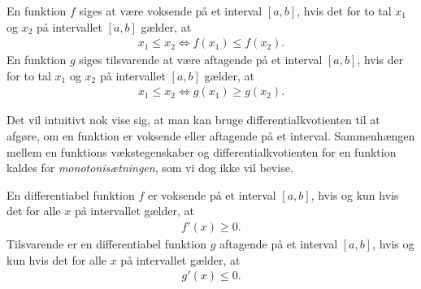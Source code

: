 \begin{defn}
	En funktion $f$ siges at være voksende på et interval $[a,b]$, hvis det for to tal $x_1$ og $x_2$ på 
	intervallet $[a,b]$ gælder, at 
	\begin{align*}
		x_1 \leq x_2 \Leftrightarrow f(x_1) \leq f(x_2).
	\end{align*}
	En funktion $g$ siges tilsvarende at være aftagende på et interval $[a,b]$, hvis der for to tal $x_1$ og 
	$x_2$ på intervallet $[a,b]$ gælder, at 
	\begin{align*}
		x_1 \leq x_2 \Leftrightarrow g(x_1) \geq g(x_2).
	\end{align*}
\end{defn}
Det vil intuitivt nok vise sig, at man kan bruge differentialkvotienten til at afgøre, om en funktion er 
voksende eller aftagende på et interval. Sammenhængen mellem en funktions vækstegenskaber og 
differentialkvotienten for en funktion kaldes for \textit{monotonisætningen}, som vi dog ikke vil bevise.
\newpage
\begin{setn}[Monotonisætningen]
	En differentiabel funktion $f$ er voksende på et interval $[a,b]$, hvis og kun hvis det for alle $x$ på 
	intervallet gælder, at 
	\begin{align*}
		f'(x) \geq 0.
	\end{align*}
	Tilsvarende er en differentiabel funktion $g$ aftagende på et interval $[a,b]$, hvis og kun hvis det for 
	alle $x$ på intervallet gælder, at 
	\begin{align*}
		g'(x) \leq 0. 
	\end{align*}
\end{setn}
